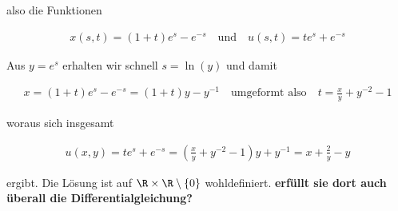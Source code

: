 \begin{solution}
also die Funktionen

\begin{align*}
    x(s,t) = (1 + t) e^s - e^{-s} \quad \text{und} \quad u(s,t) = t e^s + e^{-s}
\end{align*}

Aus $y = e^s$ erhalten wir schnell $s = \ln(y)$ und damit

\begin{align*}
    x = (1+t) e^s - e^{-s} = (1 + t)y - y^{-1} \quad \text{umgeformt also} \quad t = \frac{x}{y} + y^{-2} - 1
\end{align*}

woraus sich insgesamt

\begin{align*}
    u(x,y) = t e^s + e^{-s} = \left(\frac{x}{y} + y^{-2} - 1 \right) y + y^{-1} = x + \frac{2}{y} - y
\end{align*}

ergibt.
Die Lösung ist auf $\R \times \R \setminus \{0\}$ wohldefiniert.
\textbf{erfüllt sie dort auch überall die Differentialgleichung?}

\end{solution}



